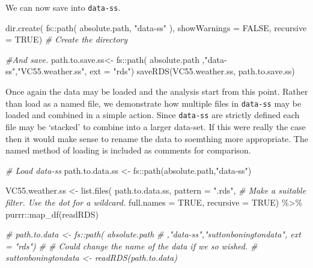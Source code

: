 \documentclass{article}
\newenvironment{Shaded}{\begin{snugshade}}{\end{snugshade}}
\newcommand{\AttributeTok}[1]{\textcolor[rgb]{0.77,0.63,0.00}{#1}}
\newcommand{\CommentTok}[1]{\textcolor[rgb]{0.56,0.35,0.01}{\textit{#1}}}
\newcommand{\ConstantTok}[1]{\textcolor[rgb]{0.00,0.00,0.00}{#1}}
\newcommand{\FunctionTok}[1]{\textcolor[rgb]{0.00,0.00,0.00}{#1}}
\newcommand{\NormalTok}[1]{#1}
\newcommand{\OtherTok}[1]{\textcolor[rgb]{0.56,0.35,0.01}{#1}}
\newcommand{\SpecialCharTok}[1]{\textcolor[rgb]{0.00,0.00,0.00}{#1}}
\newcommand{\StringTok}[1]{\textcolor[rgb]{0.31,0.60,0.02}{#1}}
\begin{document}
We can now save into \texttt{data-ss}.

\begin{Shaded}
\begin{Highlighting}[]
\FunctionTok{dir.create}\NormalTok{( }
\NormalTok{          fs}\SpecialCharTok{::}\FunctionTok{path}\NormalTok{( absolute.path,}
            \StringTok{"data{-}ss"}\NormalTok{ ),  }
            \AttributeTok{showWarnings =} \ConstantTok{FALSE}\NormalTok{,}
            \AttributeTok{recursive =} \ConstantTok{TRUE}\NormalTok{) }\CommentTok{\# Create the directory}

\CommentTok{\#And save.}
\NormalTok{path.to.save.ss}\OtherTok{\textless{}{-}}\NormalTok{ fs}\SpecialCharTok{::}\FunctionTok{path}\NormalTok{( absolute.path}
\NormalTok{                               ,}\StringTok{"data{-}ss"}\NormalTok{,}\StringTok{"VC55.weather.ss"}\NormalTok{, }\AttributeTok{ext =} \StringTok{"rds"}\NormalTok{)}
\FunctionTok{saveRDS}\NormalTok{(VC55.weather.ss, path.to.save.ss)}
\end{Highlighting}
\end{Shaded}

Once again the data may be loaded and the analysis start from this point. Rather than load as a named file, we demonstrate how multiple files in \texttt{data-ss} may be loaded and combined in a simple action. Since \texttt{data-ss} are strictly defined each file may be `stacked' to combine into a larger data-set. If this were really the case then it would make sense to rename the data to soemthing more appropriate. The named method of loading is included as comments for comparison.

\begin{Shaded}
\begin{Highlighting}[]
\CommentTok{\# Load data{-}ss}
\NormalTok{path.to.data.ss }\OtherTok{\textless{}{-}}\NormalTok{ fs}\SpecialCharTok{::}\FunctionTok{path}\NormalTok{(absolute.path,}\StringTok{"data{-}ss"}\NormalTok{)}

\NormalTok{VC55.weather.ss }\OtherTok{\textless{}{-}} \FunctionTok{list.files}\NormalTok{(}
\NormalTok{  path.to.data.ss,}
  \AttributeTok{pattern =} \StringTok{".rds"}\NormalTok{, }\CommentTok{\# Make a suitable filter. Use the dot for a wildcard.}
  \AttributeTok{full.names =} \ConstantTok{TRUE}\NormalTok{,}
  \AttributeTok{recursive =} \ConstantTok{TRUE}\NormalTok{)  }\SpecialCharTok{\%\textgreater{}\%}
\NormalTok{  purrr}\SpecialCharTok{::}\FunctionTok{map\_df}\NormalTok{(readRDS) }

\CommentTok{\# path.to.data \textless{}{-} fs::path( absolute.path}
\CommentTok{\#                                ,"data{-}ss","suttonboningtondata", ext = "rds")}
\CommentTok{\# \# Could change the name of the data if we so wished.}
\CommentTok{\# suttonboningtondata \textless{}{-}  readRDS(path.to.data)}
\end{Highlighting}
\end{Shaded}
\end{document}
